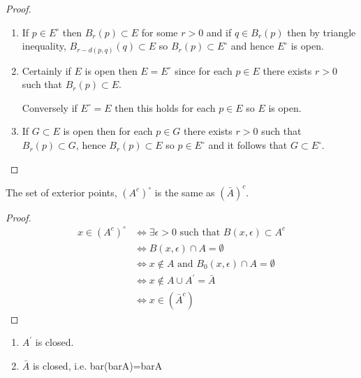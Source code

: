 \begin{proof} \
\begin{enumerate}[label=(\arabic*)]
\item If $p\in E^\circ$ then $B_r(p)\subset E$ for some $r>0$ and if $q\in B_r(p)$ then by triangle inequality, $B_{r-d(p, q)}(q)\subset E$ so $B_r(p)\subset E^\circ$ and
hence $E^\circ$ is open.

\item Certainly if $E$ is open then $E=E^\circ$ since for each $p\in E$ there exists $r>0$ such that $B_r(p)\subset E$.

Conversely if $E^\circ=E$ then this holds for each $p\in E$ so $E$ is open.

\item If $G\subset E$ is open then for each $p\in G$ there exists $r>0$ such that
$B_r(p)\subset G$, hence $B_r(p)\subset E$ so $p\in E^\circ$ and it follows that $G\subset E^\circ$.
\end{enumerate}
\end{proof}

\begin{proposition}
The set of exterior points, $(A^c)^\circ$ is the same as $(\bar{A})^c$.
\end{proposition}

\begin{proof}
\begin{align*}
x \in (A^c)^\circ 
&\iff \exists \epsilon>0 \text{ such that } B(x,\epsilon) \subset A^c \\
&\iff B(x,\epsilon) \cap A = \emptyset \\
&\iff x \notin A \text{ and } B_0(x,\epsilon) \cap A=\emptyset \\
&\iff x \notin A \cup A^\prime = \bar A \\
&\iff x \in (\bar A^c)
\end{align*}
\end{proof}

\begin{proposition}
\begin{enumerate}[label=(\arabic*)]
\item $A^\prime$ is closed.
\item $\bar{A}$ is closed, i.e. bar(barA)=barA
\end{enumerate}
\end{proposition}

